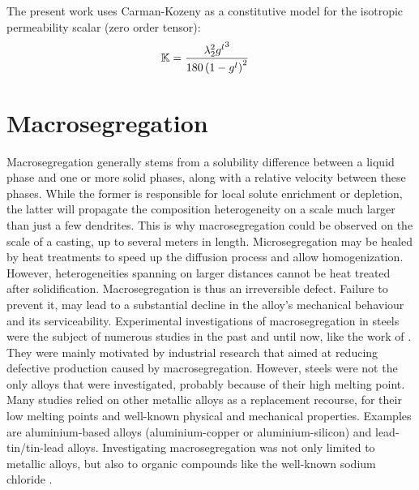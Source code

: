 The present work uses Carman-Kozeny as a constitutive model for the isotropic permeability scalar (zero order tensor):
\begin{align}
\label{eq:permeability}
& \mathbb{K}  = \frac{{\lambda}_{2}^2 {g^l}^3}{180\left( 1-{g^l} \right)^2}
\end{align}
%

%
\section{Macrosegregation}
%
Macrosegregation generally stems from a solubility difference between a liquid phase and one or more solid phases, along with
a relative velocity between these phases. While the former is responsible for local solute enrichment or depletion, the latter
will propagate the composition heterogeneity on a scale much larger than just a few dendrites.
This is why macrosegregation could be observed on the scale of a casting, up to several meters in length. 
Microsegregation may be healed by heat treatments to speed up the diffusion process and allow homogenization. However, heterogeneities 
spanning on larger distances cannot be heat treated after solidification. Macrosegregation is thus an irreversible defect. 
Failure to prevent it, may lead to a substantial decline in the alloy's mechanical behaviour and its serviceability.
Experimental investigations of macrosegregation in steels were the subject of numerous studies in the past and until now, 
like the work of \citet{suzuki_mechanism_1973,shah_effect_1989,lesoult_macrosegregation_2005}. They were mainly motivated
by industrial research that aimed at reducing defective production caused by macrosegregation.
However, steels were not the only alloys that were investigated, probably because of their high melting point. 
Many studies relied on other metallic alloys as a replacement recourse, for their low
melting points and well-known physical and mechanical properties. Examples are aluminium-based alloys 
(aluminium-copper or aluminium-silicon) \citep{lesoult_equi-axed_2001,ferreira_macrosegregation_2004,ferreira_modeling_2009} and lead-tin/tin-lead alloys\citep{hebditch_observations_1974,prescott_convective_1994,hachani_experimental_2012}. Investigating macrosegregation 
was not only limited to metallic alloys, but also to organic compounds like the well-known 
sodium chloride \citep{wanqi_formation_1989,helawell1993,ludwig2012}.
%
%

